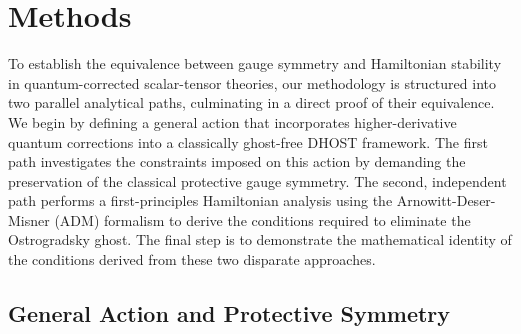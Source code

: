 \documentclass[twocolumn]{aastex631}
\begin{document}
\section{Methods}
\label{sec:methods}
To establish the equivalence between gauge symmetry and Hamiltonian stability in quantum-corrected scalar-tensor theories, our methodology is structured into two parallel analytical paths, culminating in a direct proof of their equivalence. We begin by defining a general action that incorporates higher-derivative quantum corrections into a classically ghost-free DHOST framework. The first path investigates the constraints imposed on this action by demanding the preservation of the classical protective gauge symmetry. The second, independent path performs a first-principles Hamiltonian analysis using the Arnowitt-Deser-Misner (ADM) formalism to derive the conditions required to eliminate the Ostrogradsky ghost. The final step is to demonstrate the mathematical identity of the conditions derived from these two disparate approaches.

\subsection{General Action and Protective Symmetry}
\end{document}
